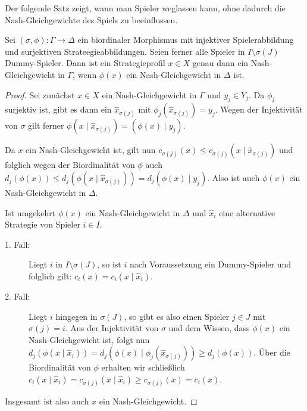 Der folgende Satz zeigt, wann man Spieler weglassen kann, ohne dadurch die Nash-Gleichgewichte des Spiels zu beeinflussen.

\begin{satz}\label{prop:DummySpielerWeglassen}
	Sei $(\sigma, \phi): \Gamma \to \Delta$ ein biordinaler Morphismus mit injektiver Spielerabbildung und surjektiven Strateegieabbildungen. Seien ferner alle Spieler in $I\setminus \sigma(J)$ Dummy-Spieler. Dann ist ein Strategieprofil $x \in X$ genau dann ein Nash-Gleichgewicht in $\Gamma$, wenn $\phi(x)$ ein Nash-Gleichgewicht in $\Delta$ ist.
\end{satz}


\begin{proof}
	Sei zunächst $x \in X$ ein Nash-Gleichgewicht in $\Gamma$ und $y_j \in Y_j$. Da $\phi_j$ surjektiv ist, gibt es dann ein $\hat{x}_{\sigma(j)}$ mit $\phi_j(\hat{x}_{\sigma(j)}) = y_j$. Wegen der Injektivität von $\sigma$ gilt ferner $\phi(x \mid \hat{x}_{\sigma(j)}) = \left(\phi(x) \mid y_j\right)$.
	
	Da $x$ ein Nash-Gleichgewicht ist, gilt nun $c_{\sigma(j)}(x) \leq c_{\sigma(j)}(x \mid \hat{x}_{\sigma(j)})$ und folglich wegen der Biordinalität von $\phi$ auch $d_j(\phi(x)) \leq d_j(\phi(x \mid \hat{x}_{\sigma(j)})) = d_j(\phi(x) \mid y_j)$. Also ist auch $\phi(x)$ ein Nash-Gleichgewicht in $\Delta$.
	
	Ist umgekehrt $\phi(x)$ ein Nash-Gleichgewicht in $\Delta$ und $\hat{x}_i$ eine alternative Strategie von Spieler $i \in I$. 
	\begin{description}
		\item[1. Fall:] Liegt $i$ in $I\setminus \sigma(J)$, so ist $i$ nach Voraussetzung ein Dummy-Spieler und folglich gilt: $c_i(x) = c_i(x \mid \hat{x}_i)$.
		\item[2. Fall:] Liegt $i$ hingegen in $\sigma(J)$, so gibt es also einen Spieler $j \in J$ mit $\sigma(j) = i$. Aus der Injektivität von $\sigma$ und dem Wissen, dass $\phi(x)$ ein Nash-Gleichgewicht ist, folgt nun $d_j(\phi(x \mid \hat{x}_i)) = d_j(\phi(x) \mid \phi_j(\hat{x}_{\sigma(j)})) \geq d_j(\phi(x))$. Über die Biordinalität von $\phi$ erhalten wir schließlich $c_i(x \mid \hat{x}_i) = c_{\sigma(j)}(x \mid \hat{x}_i) \geq c_{\sigma(j)}(x) = c_i(x)$. 
	\end{description}
	Insgesamt ist also auch $x$ ein Nash-Gleichgewicht.
\end{proof}

